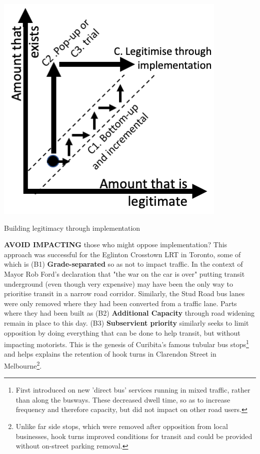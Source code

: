 \documentclass{tufte-handout}
\begin{document}
\begin{marginfigure}%
  \includegraphics[width=\linewidth]{Figure4}
  \caption{Building legitimacy through implementation}
  \label{fig:FIgure4}
\end{marginfigure}

 \textbf{AVOID IMPACTING} those who might oppose implementation?  This approach was successful for the Eglinton Crosstown LRT in Toronto, some of which is (B1) \textbf{Grade-separated} so as not to impact traffic. In the context of Mayor Rob Ford's declaration that "the war on the car is over"\cite{Kalinowski:2010ab} putting transit underground (even though very expensive) may have been the only way to prioritise transit in a narrow road corridor. Similarly,  the Stud Road bus lanes were only removed where they had been converted from a traffic lane. Parts where they had been built as (B2) \textbf{Additional Capacity} through road widening remain in place to this day.  (B3) \textbf{Subservient priority} similarly seeks to limit opposition  by doing everything that can be done to help transit, but without impacting motorists. This is the genesis of Curibita's famous tubular bus stops\footnote{First introduced on new 'direct bus' services running in mixed traffic, rather than along the busways. These decreased dwell time, so as to increase frequency and therefore capacity, but did not impact on other road users.} and helps explains the retention of hook turns in Clarendon Street in Melbourne\footnote{Unlike far side stops, which were removed after opposition from local businesses, hook turns improved conditions for transit and could be provided without on-street parking removal.}. 
\end{document}
